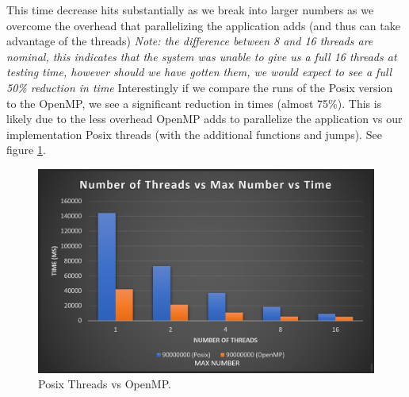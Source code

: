 This time decrease hits substantially as we break into larger numbers as we overcome the overhead that parallelizing the application adds (and thus can take advantage of the threads)
\textit{Note: the difference between 8 and 16 threads are nominal, this indicates that the system was unable to give us a full 16 threads at testing time, however should we have gotten them, we would expect to see a full 50\% reduction in time}
Interestingly if we compare the runs of the Posix version to the OpenMP, we see a significant reduction in times (almost 75\%). 
This is likely due to the less overhead OpenMP adds to parallelize the application vs our implementation Posix threads (with the additional functions and jumps).
See figure \ref{fig:sievePosixVsOpenMp}.

\begin{figure}
  \centering
  \includegraphics[width=\linewidth]{Figures/posixVsOpenMP.png}
  \caption{Posix Threads vs OpenMP.}
  \label{fig:sievePosixVsOpenMp}
\end{figure}